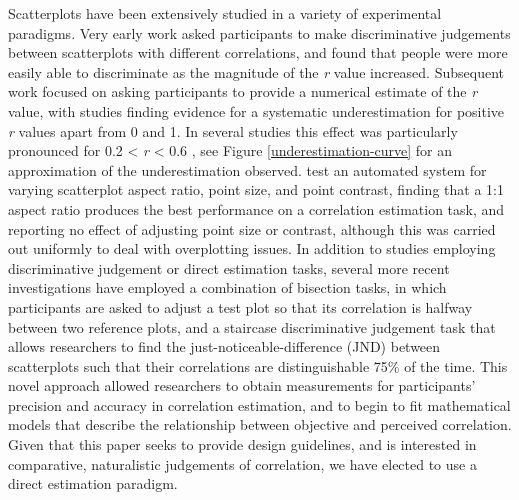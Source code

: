 \documentclass[preprint, 3p,
authoryear]{elsarticle} %
\begin{document}
Scatterplots have been extensively studied in a variety of experimental
paradigms. Very early work \citep{pollack_1960} asked participants to
make discriminative judgements between scatterplots with different
correlations, and found that people were more easily able to
discriminate as the magnitude of the \emph{r} value increased.
Subsequent work focused on asking participants to provide a numerical
estimate of the \emph{r} value, with studies finding evidence for a
systematic underestimation for positive \emph{r} values apart from 0 and
1. In several studies this effect was particularly pronounced for 0.2
\textless{} \emph{r} \textless{} 0.6
\citep{strahan_1978, bobko_1979, cleveland_1982, lane_1985, lauer_1989, collyer_1990, meyer_1992},
see Figure \ref{underestimation-curve} for an approximation of the
underestimation observed. \citet{micallef_2017} test an automated system
for varying scatterplot aspect ratio, point size, and point contrast,
finding that a 1:1 aspect ratio produces the best performance on a
correlation estimation task, and reporting no effect of adjusting point
size or contrast, although this was carried out uniformly to deal with
overplotting issues. In addition to studies employing discriminative
judgement or direct estimation tasks, several more recent investigations
have employed a combination of bisection tasks, in which participants
are asked to adjust a test plot so that its correlation is halfway
between two reference plots, and a staircase discriminative judgement
task that allows researchers to find the just-noticeable-difference
(JND) between scatterplots such that their correlations are
distinguishable 75\% of the time. This novel approach
\citep{rensink_2010} allowed researchers to obtain measurements for
participants' precision and accuracy in correlation estimation, and to
begin to fit mathematical models that describe the relationship between
objective and perceived correlation. Given that this paper seeks to
provide design guidelines, and is interested in comparative,
naturalistic judgements of correlation, we have elected to use a direct
estimation paradigm.
\end{document}
